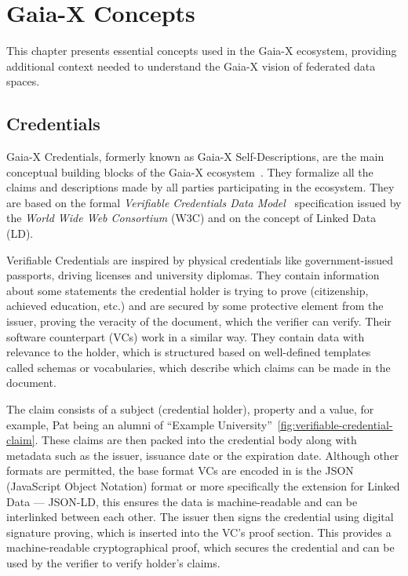 \chapter{Gaia-X Concepts}\label{ch:gaia-x-concepts}

\begin{chapterabstract}
    This chapter presents essential concepts used in the Gaia-X ecosystem, providing additional context needed to understand the Gaia-X vision of federated data spaces.
\end{chapterabstract}

\section{Credentials}\label{sec:credentials}

Gaia-X Credentials, formerly known as Gaia-X Self-Descriptions, are the main conceptual building blocks of the Gaia-X ecosystem~\cite{gaiax_architecture_document}.
They formalize all the claims and descriptions made by all parties participating in the ecosystem.
They are based on the formal \textit{Verifiable Credentials Data Model}~\cite{verifiable_credentials} specification issued by the \textit{World Wide Web Consortium} (W3C) and on the concept of Linked Data (LD).

Verifiable Credentials are inspired by physical credentials like government-issued passports, driving licenses and university diplomas.
They contain information about some statements the credential holder is trying to prove (citizenship, achieved education, etc.) and are secured by some protective element from the issuer, proving the veracity of the document, which the verifier can verify.
Their software counterpart (VCs) work in a similar way.
They contain data with relevance to the holder, which is structured based on well-defined templates called schemas or vocabularies, which describe which claims can be made in the document.

The claim consists of a subject (credential holder), property and a value, for example, Pat being an alumni of ``Example University''~\ref{fig:verifiable-credential-claim}.
These claims are then packed into the credential body along with metadata such as the issuer, issuance date or the expiration date.
Although other formats are permitted, the base format VCs are encoded in is the JSON (JavaScript Object Notation) format or more specifically the extension for Linked Data --- JSON-LD, this ensures the data is machine-readable and can be interlinked between each other.
The issuer then signs the credential using digital signature proving, which is inserted into the VC's proof section.
This provides a machine-readable cryptographical proof, which secures the credential and can be used by the verifier to verify holder's claims.

